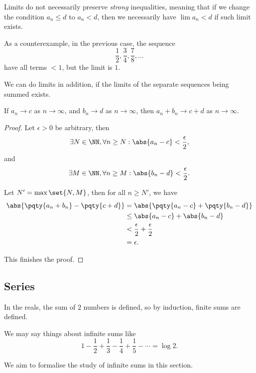 \begin{remark}
    Limits do not necessarily preserve \emph{strong} inequalities, meaning that if we change the condition \(a_n \leq d\) to \(a_n < d\), then we  necessarily have \(\lim a_n < d\) if such limit exists.

    As a counterexample, in the previous case, the sequence
    \[
        \frac{1}{2}, \frac{3}{4}, \frac{7}{8}, \ldots
    \]
    have all terms \(< 1\), but the limit is \(1\).
\end{remark}

We can do limits in addition, if the limits of the separate sequences being summed exists.

\begin{proposition}
    If \(a_n \to c\) as \(n \to \infty\), and \(b_n \to d\) as \(n \to \infty\), then \(a_n + b_n \to c + d\) as \(n \to \infty\).
\end{proposition}

\begin{proof}
    Let \(\epsilon > 0\) be arbitrary, then
    \[
        \exists N \in \NN, \forall n \geq N: \abs{a_n - c} < \frac{\epsilon}{2},
    \]
    and
    \[
        \exists M \in \NN, \forall n \geq M: \abs{b_n - d} < \frac{\epsilon}{2}.
    \]

    Let \(N' = \max\set{N, M}\), then for all \(n \geq N'\), we have
    \begin{align*}
        \abs{\pqty{a_n + b_n} - \pqty{c + d}} &= \abs{\pqty{a_n - c} + \pqty{b_n - d}} \\
        &\leq \abs{a_n - c} + \abs{b_n - d} \\
        &< \frac{\epsilon}{2} + \frac{\epsilon}{2} \\
        &= \epsilon.
    \end{align*}

    This finishes the proof.
\end{proof}

\subsection{Series}
\label{sec:series}

In the reals, the sum of \(2\) numbers is defined, so by induction, finite sums are defined.

We may say things about infinite sums like
\[
    1 - \frac{1}{2} + \frac{1}{3} - \frac{1}{4} + \frac{1}{5} - \cdots = \log 2.
\]

We aim to formalise the study of infinite sums in this section.

